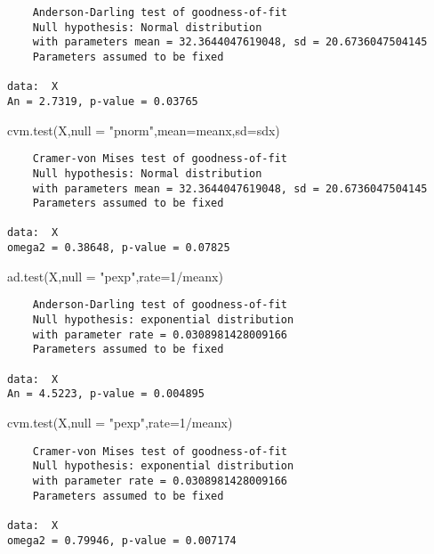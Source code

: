 \documentclass[
  a4paper,
  oneside,
  openany]{book}
\newenvironment{Shaded}{\begin{snugshade}}{\end{snugshade}}
\newcommand{\AttributeTok}[1]{\textcolor[rgb]{0.77,0.63,0.00}{#1}}
\newcommand{\DecValTok}[1]{\textcolor[rgb]{0.00,0.00,0.81}{#1}}
\newcommand{\FunctionTok}[1]{\textcolor[rgb]{0.00,0.00,0.00}{#1}}
\newcommand{\NormalTok}[1]{#1}
\newcommand{\SpecialCharTok}[1]{\textcolor[rgb]{0.00,0.00,0.00}{#1}}
\newcommand{\StringTok}[1]{\textcolor[rgb]{0.31,0.60,0.02}{#1}}
\begin{document}
\begin{verbatim}
    Anderson-Darling test of goodness-of-fit
    Null hypothesis: Normal distribution
    with parameters mean = 32.3644047619048, sd = 20.6736047504145
    Parameters assumed to be fixed

data:  X
An = 2.7319, p-value = 0.03765
\end{verbatim}

\begin{Shaded}
\begin{Highlighting}[]
\FunctionTok{cvm.test}\NormalTok{(X,}\AttributeTok{null =} \StringTok{"pnorm"}\NormalTok{,}\AttributeTok{mean=}\NormalTok{meanx,}\AttributeTok{sd=}\NormalTok{sdx)}
\end{Highlighting}
\end{Shaded}

\begin{verbatim}
    Cramer-von Mises test of goodness-of-fit
    Null hypothesis: Normal distribution
    with parameters mean = 32.3644047619048, sd = 20.6736047504145
    Parameters assumed to be fixed

data:  X
omega2 = 0.38648, p-value = 0.07825
\end{verbatim}

\begin{Shaded}
\begin{Highlighting}[]
\FunctionTok{ad.test}\NormalTok{(X,}\AttributeTok{null =} \StringTok{"pexp"}\NormalTok{,}\AttributeTok{rate=}\DecValTok{1}\SpecialCharTok{/}\NormalTok{meanx)}
\end{Highlighting}
\end{Shaded}

\begin{verbatim}
    Anderson-Darling test of goodness-of-fit
    Null hypothesis: exponential distribution
    with parameter rate = 0.0308981428009166
    Parameters assumed to be fixed

data:  X
An = 4.5223, p-value = 0.004895
\end{verbatim}

\begin{Shaded}
\begin{Highlighting}[]
\FunctionTok{cvm.test}\NormalTok{(X,}\AttributeTok{null =} \StringTok{"pexp"}\NormalTok{,}\AttributeTok{rate=}\DecValTok{1}\SpecialCharTok{/}\NormalTok{meanx)}
\end{Highlighting}
\end{Shaded}

\begin{verbatim}
    Cramer-von Mises test of goodness-of-fit
    Null hypothesis: exponential distribution
    with parameter rate = 0.0308981428009166
    Parameters assumed to be fixed

data:  X
omega2 = 0.79946, p-value = 0.007174
\end{verbatim}
\end{document}
